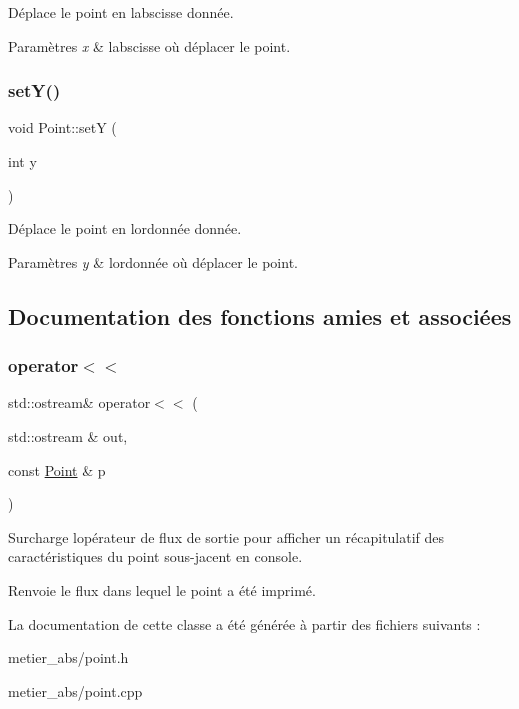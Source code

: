 Déplace le point en l\textquotesingle{}abscisse donnée. 
\begin{DoxyParams}{Paramètres}
{\em x} & l\textquotesingle{}abscisse où déplacer le point. \\
\hline
\end{DoxyParams}
\mbox{\label{class_point_afccad787a359f062efc1af5e935a99ba}} 
\subsubsection{\texorpdfstring{setY()}{setY()}}
{\footnotesize\ttfamily void Point\+::setY (\begin{DoxyParamCaption}\item[{int}]{y }\end{DoxyParamCaption})}

Déplace le point en l\textquotesingle{}ordonnée donnée. 
\begin{DoxyParams}{Paramètres}
{\em y} & l\textquotesingle{}ordonnée où déplacer le point. \\
\hline
\end{DoxyParams}


\subsection{Documentation des fonctions amies et associées}
\mbox{\label{class_point_aa818efa680e0d94ce91173ccb4b7aa08}} 
\subsubsection{\texorpdfstring{operator$<$$<$}{operator<<}}
{\footnotesize\ttfamily std\+::ostream\& operator$<$$<$ (\begin{DoxyParamCaption}\item[{std\+::ostream \&}]{out,  }\item[{const \mbox{\hyperlink{class_point}{Point}} \&}]{p }\end{DoxyParamCaption})\hspace{0.3cm}{\ttfamily [friend]}}

Surcharge l\textquotesingle{}opérateur de flux de sortie pour afficher un récapitulatif des caractéristiques du point sous-\/jacent en console. \begin{DoxyReturn}{Renvoie}
le flux dans lequel le point a été imprimé. 
\end{DoxyReturn}


La documentation de cette classe a été générée à partir des fichiers suivants \+:\begin{DoxyCompactItemize}
\item 
metier\+\_\+abs/point.\+h\item 
metier\+\_\+abs/point.\+cpp\end{DoxyCompactItemize}
